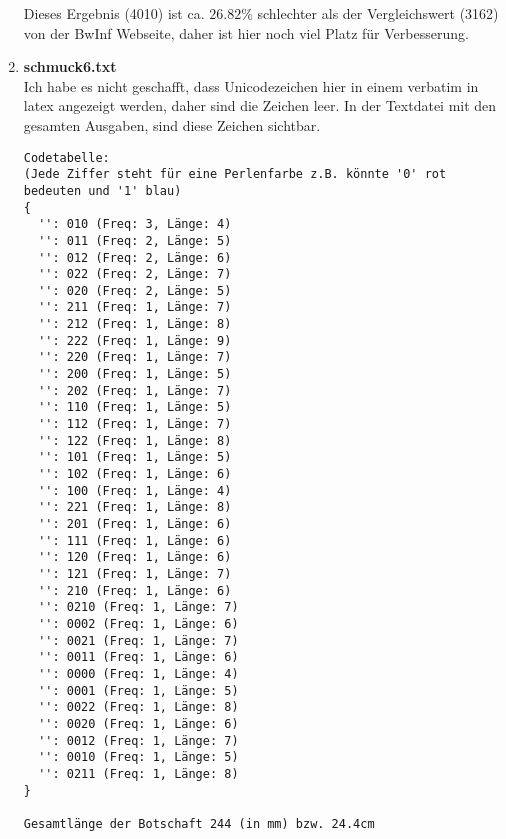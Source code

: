 \documentclass[a4paper,10pt,ngerman]{scrartcl}
\begin{document}
\begin{enumerate}
Dieses Ergebnis (4010) ist ca. $26.82\%$ schlechter als der Vergleichswert (3162) von der BwInf Webseite, daher ist hier noch viel Platz für Verbesserung.
  \item \textbf{schmuck6.txt}\\
  Ich habe es nicht geschafft, dass Unicodezeichen hier in einem verbatim in latex angezeigt werden, daher sind die Zeichen leer. In der Textdatei mit den gesamten Ausgaben, sind diese Zeichen sichtbar.
\begin{verbatim}
Codetabelle:
(Jede Ziffer steht für eine Perlenfarbe z.B. könnte '0' rot bedeuten und '1' blau)
{
  '': 010 (Freq: 3, Länge: 4)
  '': 011 (Freq: 2, Länge: 5)
  '': 012 (Freq: 2, Länge: 6)
  '': 022 (Freq: 2, Länge: 7)
  '': 020 (Freq: 2, Länge: 5)
  '': 211 (Freq: 1, Länge: 7)
  '': 212 (Freq: 1, Länge: 8)
  '': 222 (Freq: 1, Länge: 9)
  '': 220 (Freq: 1, Länge: 7)
  '': 200 (Freq: 1, Länge: 5)
  '': 202 (Freq: 1, Länge: 7)
  '': 110 (Freq: 1, Länge: 5)
  '': 112 (Freq: 1, Länge: 7)
  '': 122 (Freq: 1, Länge: 8)
  '': 101 (Freq: 1, Länge: 5)
  '': 102 (Freq: 1, Länge: 6)
  '': 100 (Freq: 1, Länge: 4)
  '': 221 (Freq: 1, Länge: 8)
  '': 201 (Freq: 1, Länge: 6)
  '': 111 (Freq: 1, Länge: 6)
  '': 120 (Freq: 1, Länge: 6)
  '': 121 (Freq: 1, Länge: 7)
  '': 210 (Freq: 1, Länge: 6)
  '': 0210 (Freq: 1, Länge: 7)
  '': 0002 (Freq: 1, Länge: 6)
  '': 0021 (Freq: 1, Länge: 7)
  '': 0011 (Freq: 1, Länge: 6)
  '': 0000 (Freq: 1, Länge: 4)
  '': 0001 (Freq: 1, Länge: 5)
  '': 0022 (Freq: 1, Länge: 8)
  '': 0020 (Freq: 1, Länge: 6)
  '': 0012 (Freq: 1, Länge: 7)
  '': 0010 (Freq: 1, Länge: 5)
  '': 0211 (Freq: 1, Länge: 8)
}

Gesamtlänge der Botschaft 244 (in mm) bzw. 24.4cm


\end{verbatim}
\end{enumerate}
\end{document}
